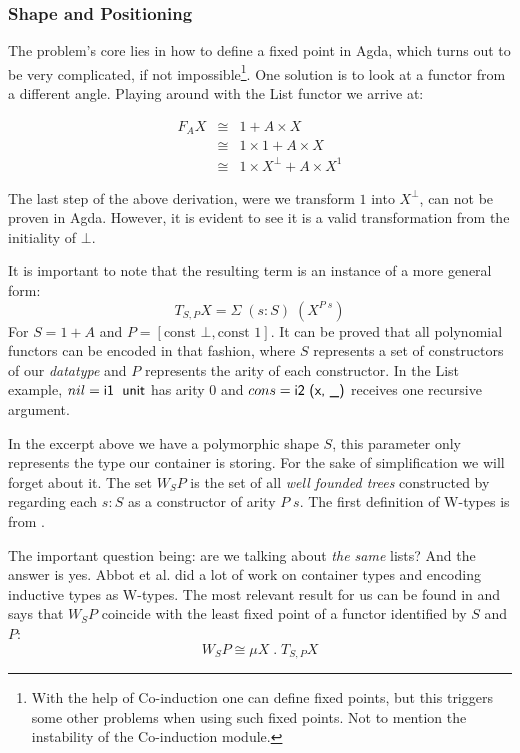 \subsubsection{Shape and Positioning}

The problem's core lies in how to define a fixed point in Agda, which turns out 
to be very complicated, if not impossible\footnote{%
With the help of Co-induction one can define fixed points, but this triggers some other
problems when using such fixed points. Not to mention the instability of the Co-induction module.
}. One solution is to look at a functor from a different angle. Playing around with
the List functor we arrive at:

\begin{eqnarray*}
  F_A X & \cong & 1 + A \times X \\
        & \cong & 1 \times 1 + A \times X \\
        & \cong & 1 \times X^\bot + A \times X^1
\end{eqnarray*}

The last step of the above derivation, were we transform $1$ into $X^\bot$, can not be proven
in Agda. However, it is evident to see it is a valid transformation from the initiality of $\bot$.

It is important to note that the resulting term is an instance of a more general form: 
\[ T_{S, P} X = \Sigma\; (s : S)\; (X^{P\; s})\] 
For $S = 1 + A$ and $P = [ \text{const }\bot , \text{const }1 ]$. It can be proved
that all polynomial functors can be encoded in that fashion\cite{Abbott04}, where $S$ represents
a set of constructors of our \emph{datatype} and $P$ represents the arity of each constructor.
In the List example, $nil = \IC{i1\; unit}$ has arity 0 and $cons = \IC{i2 (x, \_)}$ receives
one recursive argument.


In the excerpt above we have a polymorphic shape $S$, this parameter
only represents the type our container is storing. For the sake of simplification we will forget about it.
The set $W_S P$ is the set of all \emph{well founded trees} constructed by regarding each $s : S$ 
as a constructor of arity $P\; s$. The first definition of W-types is from \cite{lof84}.


The important question being: are we talking about \emph{the same} lists? And the answer 
is yes. Abbot et al. did a lot of work on container types
and encoding inductive types as W-types. The most relevant result for us can be found in \cite{Abbott04} and
says that $W_S P$ coincide with the least fixed point of a functor identified by $S$ and $P$:
\[
  W_S P \cong \mu X\; . \;T_{S , P} X
\]

